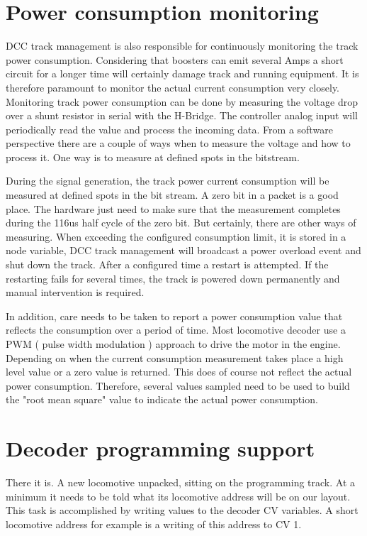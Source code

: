 \section{Power consumption monitoring}

DCC track management is also responsible for continuously monitoring the track power consumption. Considering that boosters can emit several Amps a short circuit for a longer time will certainly damage track and running equipment. It is therefore paramount to monitor the actual current consumption very closely. Monitoring track power consumption can be done by measuring the voltage drop over a shunt resistor in serial with the H-Bridge. The controller analog input will periodically read the value and process the incoming data. From a software perspective there are a couple of ways when to measure the voltage and how to process it. One way is to measure at defined spots in the bitstream.

During the signal generation, the track power current consumption will be measured at defined spots in the bit stream. A zero bit in a packet is a good place. The hardware just need to make sure that the measurement completes during the 116us half cycle of the zero bit. But certainly, there are other ways of measuring. When exceeding the configured consumption limit, it is stored in a node variable, DCC track management will broadcast a power overload event and shut down the track. After a configured time a restart is attempted. If the restarting fails for several times, the track is powered down permanently and manual intervention is required.

In addition, care needs to be taken to report a power consumption value that reflects the consumption over a period of time. Most locomotive decoder use a PWM ( pulse width modulation ) approach to drive the motor in the engine. Depending on when the current consumption measurement takes place a high level value or a zero value is returned. This does of course not reflect the actual power consumption. Therefore, several values sampled need to be used to build the "root mean square" value to indicate the actual power consumption.

\section{Decoder programming support}

There it is. A new locomotive unpacked, sitting on the programming track. At a minimum it needs to be told what its locomotive address will be on our layout. This task is accomplished by writing values to the decoder CV variables. A short locomotive address for example is a writing of this address to CV 1.

